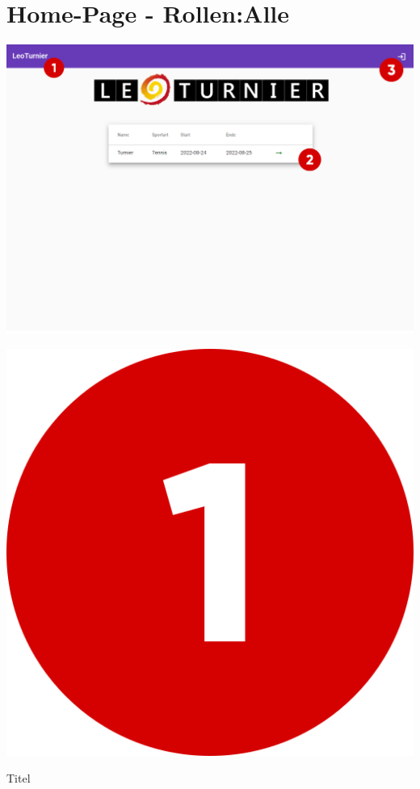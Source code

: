 \section{Home-Page - Rollen:Alle}
\includegraphics[scale=0.4]{pics/user-guide/homepage.png}
\bigskip

\includegraphics[scale=0.05]{pics/user-guide/numbers/number-1.png} \begin{LARGE} Titel \end{LARGE}

